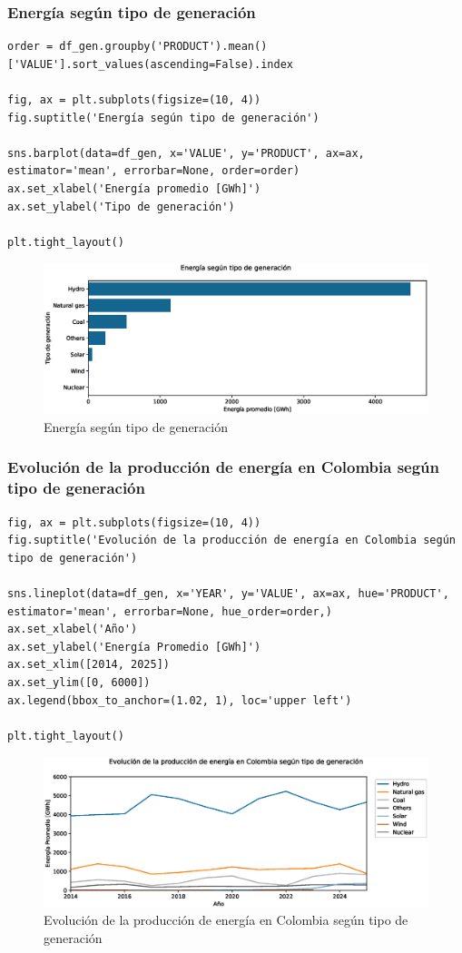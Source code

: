 \documentclass{article}
\begin{document}
\subsubsection{Energía según tipo de generación}

\begin{verbatim}
order = df_gen.groupby('PRODUCT').mean()['VALUE'].sort_values(ascending=False).index

fig, ax = plt.subplots(figsize=(10, 4))
fig.suptitle('Energía según tipo de generación')

sns.barplot(data=df_gen, x='VALUE', y='PRODUCT', ax=ax, estimator='mean', errorbar=None, order=order)
ax.set_xlabel('Energía promedio [GWh]')
ax.set_ylabel('Tipo de generación')

plt.tight_layout()
\end{verbatim}

\begin{figure}[t]
	\centering
	\includegraphics[width=0.7\linewidth]{fig_7}
	\caption{Energía según tipo de generación}
	\label{fig:fig7}
\end{figure}

\subsubsection{Evolución de la producción de energía en Colombia según tipo de generación}

\begin{verbatim}
fig, ax = plt.subplots(figsize=(10, 4))
fig.suptitle('Evolución de la producción de energía en Colombia según tipo de generación')

sns.lineplot(data=df_gen, x='YEAR', y='VALUE', ax=ax, hue='PRODUCT', estimator='mean', errorbar=None, hue_order=order,)
ax.set_xlabel('Año')
ax.set_ylabel('Energía Promedio [GWh]')
ax.set_xlim([2014, 2025])
ax.set_ylim([0, 6000])
ax.legend(bbox_to_anchor=(1.02, 1), loc='upper left')

plt.tight_layout()
\end{verbatim}

\begin{figure}[t]
	\centering
	\includegraphics[width=0.7\linewidth]{fig_8}
	\caption{Evolución de la producción de energía en Colombia según tipo de generación}
	\label{fig:fig8}
\end{figure}
\end{document}
